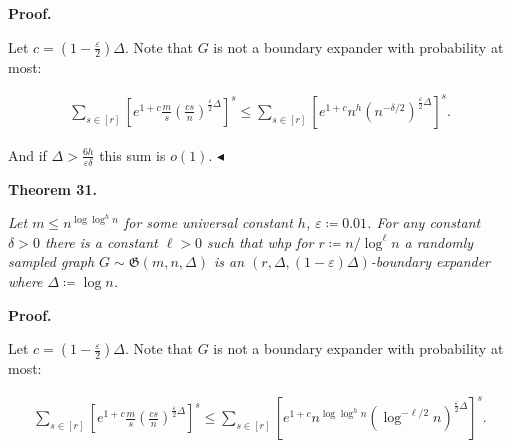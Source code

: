 



\par\medskip\noindent\textbf{Proof.}\par




Let $c=(1-\frac{\varepsilon}{2})\Delta$. Note that $G$ is not a boundary expander with
probability at most:\par


\[\begin{gathered}
\displaystyle\sum\limits_{s\in[r]}\left[e^{1+c}\frac{m}{s}\left(\frac{cs}{n}%
\right)^{\frac{\varepsilon}{2}\Delta}\right]^{s}\leq \displaystyle\sum\limits_{s\in[r]}\left[e^{1+c}n^{h}\left(n^{-\delta/2}\right)%
^{\frac{\varepsilon}{2}\Delta}\right]^{s}.
\end{gathered}\]


And if $\Delta>\frac{6h}{\varepsilon\delta}$ this sum is $o(1)$.
$\blacktriangleleft$\par





\par\medskip\noindent\textbf{
\textbf{Theorem 31}\textbf{.}
}\par



\emph{Let $m\leq n^{\log\log^{h}n}$ for some universal constant $h$, $\varepsilon\coloneqq 0.01$. For
any constant $\delta>0$ there is a constant $\ell>0$ such that whp for $r\coloneqq n/\log^{\ell}n$ a randomly sampled graph $G\sim\mathfrak{G}(m,n,\Delta)$ is an $(r,\Delta,(1-\varepsilon)\Delta)$-boundary expander where $\Delta\coloneqq\log n$.}\par







\par\medskip\noindent\textbf{Proof.}\par




Let $c=(1-\frac{\varepsilon}{2})\Delta$. Note that $G$ is not a boundary expander with
probability at most:\par


\[\begin{gathered}
\displaystyle\sum\limits_{s\in[r]}\left[e^{1+c}\frac{m}{s}\left(\frac{cs}{n}%
\right)^{\frac{\varepsilon}{2}\Delta}\right]^{s}\leq \displaystyle\sum\limits_{s\in[r]}\left[e^{1+c}n^{\log\log^{h}n}\left(\log^{-%
\ell/2}n\right)^{\frac{\varepsilon}{2}\Delta}\right]^{s}.
\end{gathered}\]


